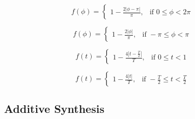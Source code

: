 \documentclass[12pt,twoside]{report}
\begin{document}
\begin{multicols}{2}

  \begin{equation}
    f(\phi) =
    \begin{cases}
      1 - \frac{2 |\phi - \pi|}{\pi},& \text{if } 0 \leq \phi < 2 \pi
    \end{cases}
    \label{eq:dtri1}
  \end{equation}

  \begin{equation}
    f(\phi) =
    \begin{cases}
      1 - \frac{2 |\phi|}{\pi},& \text{if } -\pi \leq \phi < \pi
    \end{cases}
    \label{eq:dtri2}
  \end{equation}

\end{multicols}

\begin{multicols}{2}

  \begin{equation}
    f(t) =
    \begin{cases}
      1 - \frac{4 |t - \frac{T}{2}|}{T},& \text{if } 0 \leq t < 1
    \end{cases}
    \label{eq:dtri3}
  \end{equation}

  \begin{equation}
    f(t) =
    \begin{cases}
      1 - \frac{4 |t|}{T},& \text{if } -\frac{T}{2} \leq t < \frac{T}{2}
    \end{cases}
    \label{eq:dtri4}
  \end{equation}

\end{multicols}

\begin{table}
\end{table}

\subsection{Additive Synthesis}
\end{document}
